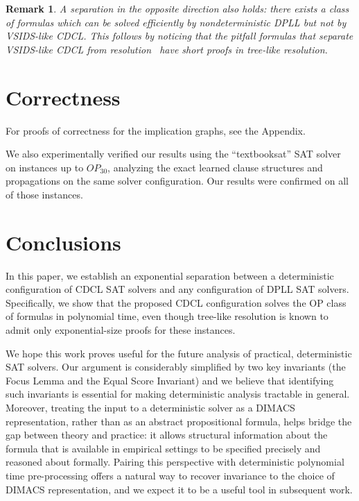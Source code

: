 \documentclass[10pt,a4paper]{article}
\newtheorem{remark}[theorem]{Remark}
\begin{document}
\begin{remark}
A separation in the opposite direction also holds: there exists a class of formulas which can be solved efficiently by nondeterministic DPLL but not by VSIDS-like CDCL. This follows by noticing that the pitfall formulas that separate VSIDS-like CDCL from resolution~\cite{pitfall} have short proofs in tree-like resolution.
\end{remark}

\section{Correctness}

For proofs of correctness for the implication graphs, see the Appendix.

We also experimentally verified our results using the ``textbooksat'' SAT solver ~\cite{vinyals_textbooksat} on instances up to $OP_{30}$, analyzing the exact learned clause structures and propagations on the same solver configuration. Our results were confirmed on all of those instances.

\section{Conclusions}
In this paper, we establish an exponential separation between a deterministic configuration of CDCL SAT solvers and any configuration of DPLL SAT solvers. Specifically, we show that the proposed CDCL configuration solves the OP class of formulas in polynomial time, even though tree-like resolution is known to admit only exponential-size proofs for these instances.

We hope this work proves useful for the future analysis of practical, deterministic SAT solvers. Our argument is considerably simplified by two key invariants (the Focus Lemma and the Equal Score Invariant) and we believe that identifying such invariants is essential for making deterministic analysis tractable in general. Moreover, treating the input to a deterministic solver as a DIMACS representation, rather than as an abstract propositional formula, helps bridge the gap between theory and practice: it allows structural information about the formula that is available in empirical settings to be specified precisely and reasoned about formally. Pairing this perspective with deterministic polynomial time pre-processing offers a natural way to recover invariance to the choice of DIMACS representation, and we expect it to be a useful tool in subsequent work.
\end{document}
